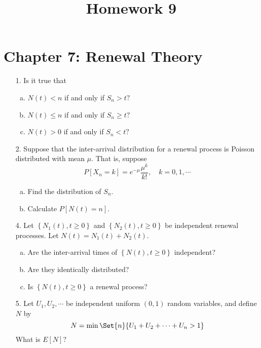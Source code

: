 \documentclass{article}
\begin{document}
\title{Homework 9}
\maketitle
\thispagestyle{fancy}

\section*{Chapter 7: Renewal Theory}

\begin{itemize}
	\item[1.] Is it true that
		\begin{enumerate}[(a)]
			\item $N(t)<n$ if and only if $S_n>t?$

			\item $N(t)\le n$ if and only if $S_n\ge t?$

			\item $N(t)>0$ if and only if $S_n<t?$
				
		\end{enumerate}

	\item[2.] Suppose that the inter-arrival distribution for a renewal process is Poisson distributed with mean $\mu.$ That is, suppose
		\[P[X_n=k] = e^{-\mu} \frac{\mu^k}{k!}, \quad k=0, 1, \cdots\]
		\begin{enumerate}[(a)]
			\item Find the distribution of $S_n.$

			\item Calculate $P[N(t)=n].$
				
		\end{enumerate}

	\item[4.] Let $\left\{ N_1(t), t\ge 0 \right\}$ and $\left\{ N_2(t), t\ge 0 \right\}$ be independent renewal processes. Let $N(t)=N_1(t)+N_2(t).$
		\begin{enumerate}[(a)]
			\item Are the inter-arrival times of $\left\{ N(t), t\ge 0 \right\}$ independent?

			\item Are they identically distributed?

			\item Is $\left\{ N(t), t\ge 0 \right\}$ a renewal process?
				
		\end{enumerate}

	\item[5.] Let $U_1, U_2, \cdots$ be independent uniform $(0, 1)$ random variables, and define $N$ by
		\[N=\min\Set{n}{U_1+U_2+\cdots+U_n>1}\]
		What is $E[N]?$


\end{itemize}
\end{document}

